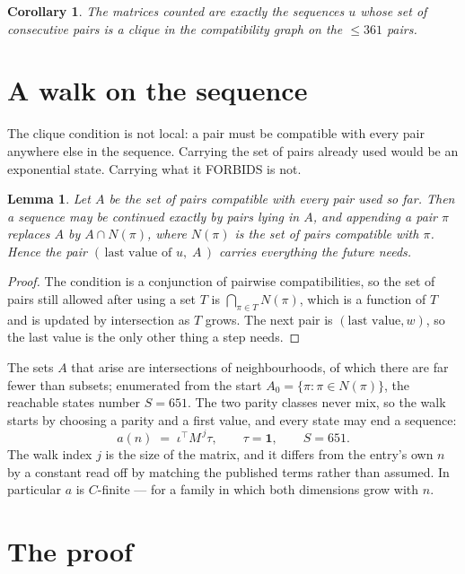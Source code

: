 \documentclass[11pt,a4paper]{article}
\theoremstyle{plain}
\newtheorem{lemma}[theorem]{Lemma}
\newtheorem{corollary}[theorem]{Corollary}
\theoremstyle{definition}
\begin{document}
\begin{corollary}
The matrices counted are exactly the sequences $u$ whose set of consecutive pairs is a clique in
the compatibility graph on the $\le 361$ pairs.
\end{corollary}

\section{A walk on the sequence}

The clique condition is not local: a pair must be compatible with every pair anywhere else in
the sequence. Carrying the set of pairs already used would be an exponential state. Carrying
what it FORBIDS is not.

\begin{lemma}\label{lem:lump}
Let $A$ be the set of pairs compatible with every pair used so far. Then a sequence may be
continued exactly by pairs lying in $A$, and appending a pair $\pi$ replaces $A$ by
$A\cap N(\pi)$, where $N(\pi)$ is the set of pairs compatible with $\pi$. Hence the pair
$(\,\text{last value of }u,\;A\,)$ carries everything the future needs.
\end{lemma}

\begin{proof}
The condition is a conjunction of pairwise compatibilities, so the set of pairs still allowed
after using a set $T$ is $\bigcap_{\pi\in T}N(\pi)$, which is a function of $T$ and is updated
by intersection as $T$ grows. The next pair is $(\text{last value},w)$, so the last value is
the only other thing a step needs.
\end{proof}

The sets $A$ that arise are intersections of neighbourhoods, of which there are far fewer than
subsets; enumerated from the start $A_0=\{\pi:\pi\in N(\pi)\}$, the reachable states number
$S=651$. The two parity classes never mix, so the walk starts by choosing a parity and a first
value, and every state may end a sequence:
\[
a(n)\;=\;\iota^{\!\top}M^{\,j}\tau ,\qquad \tau=\mathbf{1},\qquad S=651.
\]
The walk index $j$ is the size of the matrix, and it differs from the entry's own $n$ by a
constant read off by matching the published terms rather than assumed. In particular $a$ is
$C$-finite --- for a family in which both dimensions grow with $n$.

\section{The proof}
\end{document}
